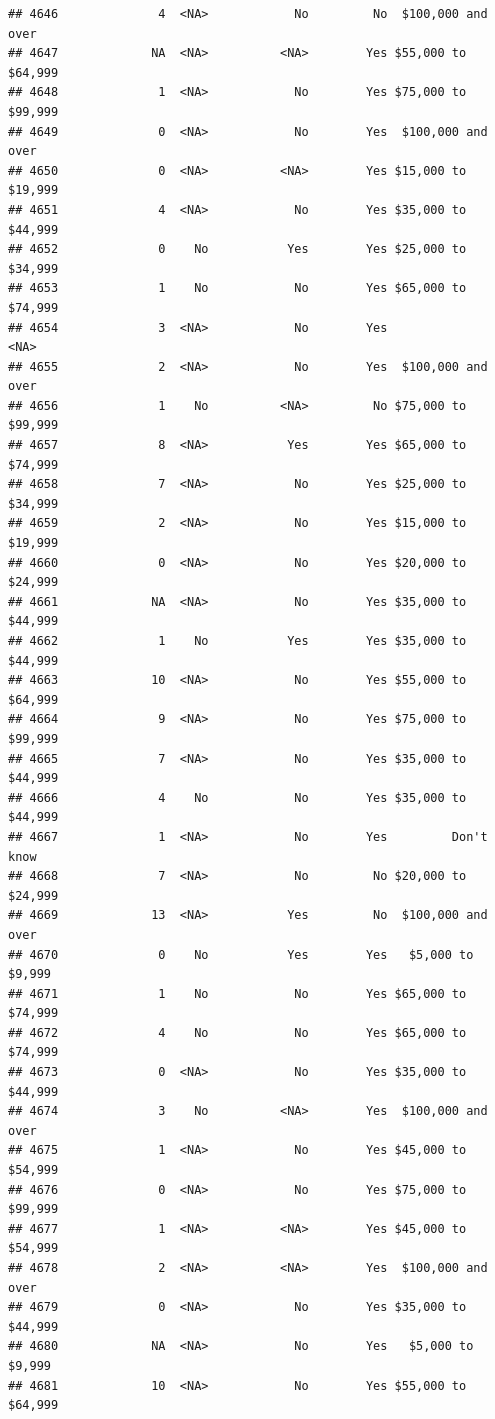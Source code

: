 \documentclass[man]{apa6}
\begin{document}
\begin{verbatim}
## 4646              4  <NA>            No         No  $100,000 and over
## 4647             NA  <NA>          <NA>        Yes $55,000 to $64,999
## 4648              1  <NA>            No        Yes $75,000 to $99,999
## 4649              0  <NA>            No        Yes  $100,000 and over
## 4650              0  <NA>          <NA>        Yes $15,000 to $19,999
## 4651              4  <NA>            No        Yes $35,000 to $44,999
## 4652              0    No           Yes        Yes $25,000 to $34,999
## 4653              1    No            No        Yes $65,000 to $74,999
## 4654              3  <NA>            No        Yes               <NA>
## 4655              2  <NA>            No        Yes  $100,000 and over
## 4656              1    No          <NA>         No $75,000 to $99,999
## 4657              8  <NA>           Yes        Yes $65,000 to $74,999
## 4658              7  <NA>            No        Yes $25,000 to $34,999
## 4659              2  <NA>            No        Yes $15,000 to $19,999
## 4660              0  <NA>            No        Yes $20,000 to $24,999
## 4661             NA  <NA>            No        Yes $35,000 to $44,999
## 4662              1    No           Yes        Yes $35,000 to $44,999
## 4663             10  <NA>            No        Yes $55,000 to $64,999
## 4664              9  <NA>            No        Yes $75,000 to $99,999
## 4665              7  <NA>            No        Yes $35,000 to $44,999
## 4666              4    No            No        Yes $35,000 to $44,999
## 4667              1  <NA>            No        Yes         Don't know
## 4668              7  <NA>            No         No $20,000 to $24,999
## 4669             13  <NA>           Yes         No  $100,000 and over
## 4670              0    No           Yes        Yes   $5,000 to $9,999
## 4671              1    No            No        Yes $65,000 to $74,999
## 4672              4    No            No        Yes $65,000 to $74,999
## 4673              0  <NA>            No        Yes $35,000 to $44,999
## 4674              3    No          <NA>        Yes  $100,000 and over
## 4675              1  <NA>            No        Yes $45,000 to $54,999
## 4676              0  <NA>            No        Yes $75,000 to $99,999
## 4677              1  <NA>          <NA>        Yes $45,000 to $54,999
## 4678              2  <NA>          <NA>        Yes  $100,000 and over
## 4679              0  <NA>            No        Yes $35,000 to $44,999
## 4680             NA  <NA>            No        Yes   $5,000 to $9,999
## 4681             10  <NA>            No        Yes $55,000 to $64,999

\end{verbatim}
\end{document}
